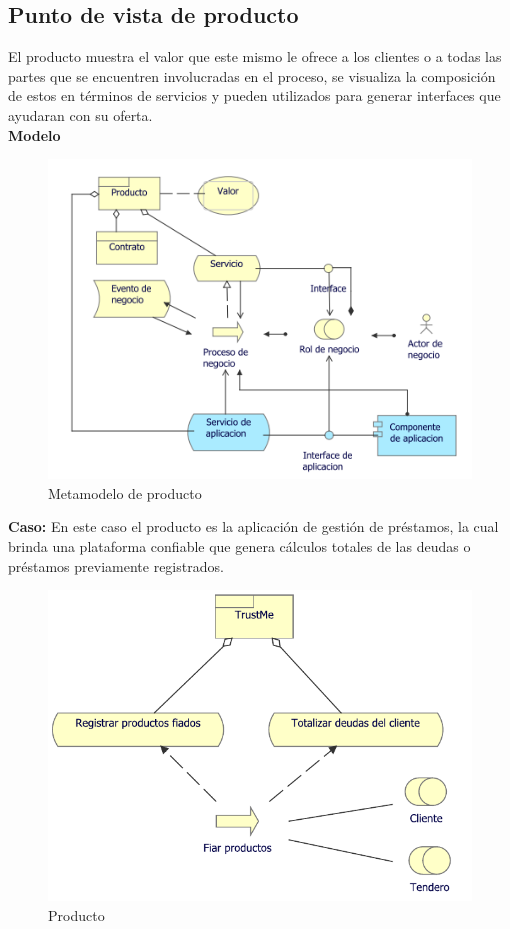	\subsection{Punto de vista de producto}
	{ El producto muestra el valor que este mismo le ofrece a los clientes o a todas las partes que se encuentren involucradas en el proceso, se visualiza la composición de estos en términos de servicios y pueden utilizados para generar interfaces que ayudaran con su oferta.\\
		
		\textbf{Modelo}\\
		\begin{figure}[H]
			\centering
			\includegraphics[width=0.8\linewidth]{development/producto.png}
			\caption{Metamodelo de producto}
		\end{figure}
		
		\textbf{Caso:} En este caso el producto es la aplicación de gestión de préstamos, la cual brinda una plataforma confiable que genera cálculos totales de las deudas o préstamos previamente registrados.
	
		
		\begin{figure}[H]
			\centering
			\includegraphics[width=0.8\linewidth]{development/producto.pdf}
			\caption{Producto}
		\end{figure}
	}
